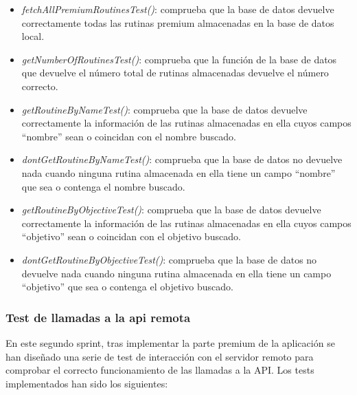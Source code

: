 \documentclass[11pt,a4paper]{report}
\begin{document}
\begin{itemize}
	\item \textit{fetchAllPremiumRoutinesTest()}: comprueba que la base de datos devuelve correctamente todas las rutinas premium almacenadas en la base de datos local.

	\item \textit{getNumberOfRoutinesTest()}: comprueba que la función de la base de datos que devuelve el número total de rutinas almacenadas devuelve el número correcto.

	\item \textit{getRoutineByNameTest()}: comprueba que la base de datos devuelve correctamente la información de las rutinas almacenadas en ella cuyos campos “nombre” sean o coincidan con el nombre buscado.

	\item \textit{dontGetRoutineByNameTest()}: comprueba que la base de datos no devuelve nada cuando ninguna rutina almacenada en ella tiene un campo “nombre” que sea o contenga el nombre buscado.

	\item \textit{getRoutineByObjectiveTest()}: comprueba que la base de datos devuelve correctamente la información de las rutinas almacenadas en ella cuyos campos “objetivo” sean o coincidan con el objetivo buscado.

	\item \textit{dontGetRoutineByObjectiveTest()}: comprueba que la base de datos no devuelve nada cuando ninguna rutina almacenada en ella tiene un campo “objetivo” que sea o contenga el objetivo buscado.

\end{itemize}

\subsubsection{Test de llamadas a la api remota}

En este segundo sprint, tras implementar la parte premium de la aplicación se han diseñado una serie de test de interacción con el servidor remoto para comprobar el correcto funcionamiento de las llamadas a la API. Los tests implementados han sido los siguientes:
\end{document}
